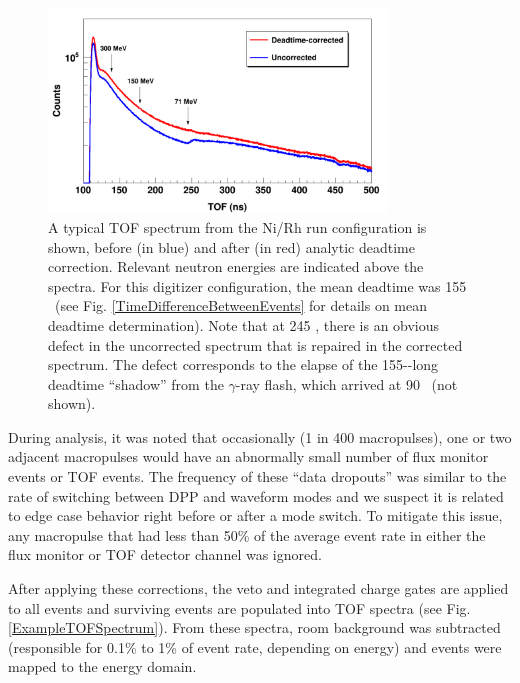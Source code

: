 \begin{figure}[tb]
    \centering
    \includegraphics[width=0.8\textwidth]{figures/CorrectionEffectOnTOF.png}
    \caption[The effect of deadtime correction on a typical time-of-flight spectrum]
    {
        A typical TOF spectrum from the Ni/Rh
        run configuration is shown, before (in blue) and after (in red) analytic
        deadtime correction. Relevant neutron energies are indicated above the spectra.
        For this digitizer configuration, the mean deadtime was 155
        \nano\second\ (see Fig.
        \ref{TimeDifferenceBetweenEvents} for details on mean deadtime determination).
        Note that at 245 \nano\second, there is an
        obvious defect in the uncorrected spectrum that is repaired in the corrected
        spectrum. The defect
        corresponds to the elapse of the 155-\nano\second-long deadtime
        ``shadow'' from the $\gamma$-ray flash, which arrived at 90
        \nano\second\ (not shown).
    }
    \label{CorrectionEffectOnTOF}
\end{figure}

During analysis, it was noted that occasionally (1 in 400 macropulses), one or two 
adjacent macropulses would have an abnormally small number of flux monitor events or 
TOF events. The frequency of these ``data dropouts'' was similar to the rate of
switching between DPP and waveform modes and we suspect it is related to edge
case behavior right before or after a mode switch. To mitigate this issue,
any macropulse that had less than 50\% of the average event rate in either the
flux monitor or TOF detector channel was ignored.

After applying these corrections, the veto and integrated charge gates are applied to 
all events and surviving events are populated into TOF spectra (see Fig.
\ref{ExampleTOFSpectrum}). From these spectra, room background was subtracted
(responsible for 0.1\% to 1\% of event rate, depending on energy)
and events were mapped to the energy domain.

